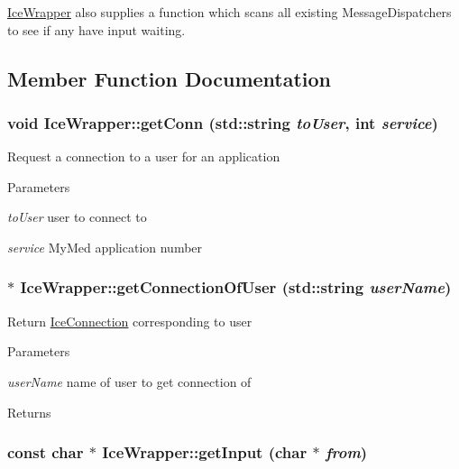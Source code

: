 \hyperlink{classIceWrapper}{IceWrapper} also supplies a function which scans all existing MessageDispatchers to see if any have input waiting. 

\subsection{Member Function Documentation}
\hypertarget{classIceWrapper_a9577eeda39e60b4abc835c3ce81604f8}{
\subsubsection[{getConn}]{\setlength{\rightskip}{0pt plus 5cm}void IceWrapper::getConn (std::string {\em toUser}, \/  int {\em service})}}
\label{classIceWrapper_a9577eeda39e60b4abc835c3ce81604f8}
Request a connection to a user for an application 
\begin{DoxyParams}{Parameters}
\item[{\em toUser}]user to connect to \item[{\em service}]MyMed application number \end{DoxyParams}
\hypertarget{classIceWrapper_aa0cecd8091a65ccbfbe48c2397532e42}{
\subsubsection[{getConnectionOfUser}]{ $\ast$ IceWrapper::getConnectionOfUser (std::string {\em userName})}}
\label{classIceWrapper_aa0cecd8091a65ccbfbe48c2397532e42}
Return \hyperlink{classIceConnection}{IceConnection} corresponding to user 
\begin{DoxyParams}{Parameters}
\item[{\em userName}]name of user to get connection of \end{DoxyParams}
\begin{DoxyReturn}{Returns}

\end{DoxyReturn}
\hypertarget{classIceWrapper_a6e73ef401f985702be9d97abdbb1eb06}{
\subsubsection[{getInput}]{\setlength{\rightskip}{0pt plus 5cm}const char $\ast$ IceWrapper::getInput (char $\ast$ {\em from})}}
